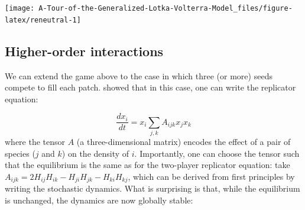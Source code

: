 \documentclass[]{book}
\begin{document}
\begin{center}\texttt{[image: A-Tour-of-the-Generalized-Lotka-Volterra-Model\_files/figure-latex/reneutral-1]} \end{center}

\hypertarget{higher-order-interactions}{%
\subsection{Higher-order interactions}\label{higher-order-interactions}}

We can extend the game above to the case in which three (or more) seeds compete to fill each patch. \citet{grilli2017higher} showed that in this case, one can write the replicator equation:

\[
\dfrac{d x_i}{dt} = x_i \sum_{j,k} A_{ijk} x_j x_k
\]
where the tensor \(A\) (a three-dimensional matrix) encodes the effect of a pair of species (\(j\) and \(k\)) on the density of \(i\). Importantly, one can choose the tensor such that the equilibrium is the same as for the two-player replicator equation: take \(A_{ijk} = 2 H_{ij} H_{ik} - H_{ji} H_{jk} - H_{ki} H_{kj}\), which can be derived from first principles by writing the stochastic dynamics. What is surprising is that, while the equilibrium is unchanged, the dynamics are now globally stable:
\end{document}
